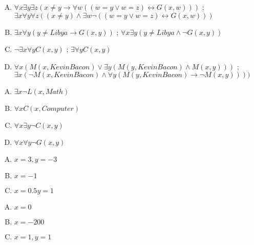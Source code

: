{{        %
        \begin{practices}
            \begin{enumerate}[A.]
                \item $\forall x \exists y \exists z (x \neq y \rightarrow \forall w ((w = y \vee w = z) \leftrightarrow G(x, w)))$ ; $\exists x \forall y \forall z ((x \neq y) \wedge \exists w \neg ((w = y \vee w = z) \leftrightarrow G(x, w)))$
                \item $\exists x \forall y (y \neq Libya \rightarrow G(x, y))$ ; $\forall x \exists y (y \neq Libya \wedge \neg G(x, y))$
                \item $\neg \exists x \forall y C(x, y)$ ; $\exists \forall y C(x, y)$
                \item $\forall x (M(x, Kevin Bacon) \vee \exists y (M(y, Kevin Bacon) \wedge M(x, y)))$ ; $\exists x (\neg M(x, Kevin Bacon) \wedge \forall y (M(y, Kevin Bacon) \rightarrow \neg M(x, y))))$
            \end{enumerate}
        \end{practices}

        \begin{practices}
            \begin{enumerate}[A.]
                \item $\exists x \neg L(x, Math)$
                \item $\forall x C(x, Computer)$
                \item $\forall x \exists y \neg C(x, y)$
                \item $\forall x \forall y \neg G(x, y)$
            \end{enumerate}
        \end{practices}

        \begin{practices}
            \begin{enumerate}[A.]
                \item $x = 3, y = -3$
                \item $x = -1$
                \item $x = 0.5 y = 1$
            \end{enumerate}
        \end{practices}

        \begin{practices}
            \begin{enumerate}[A.]
                \item $x = 0$
                \item $x = -200$
                \item $x = 1, y = 1$
            \end{enumerate}
        \end{practices}

}}
